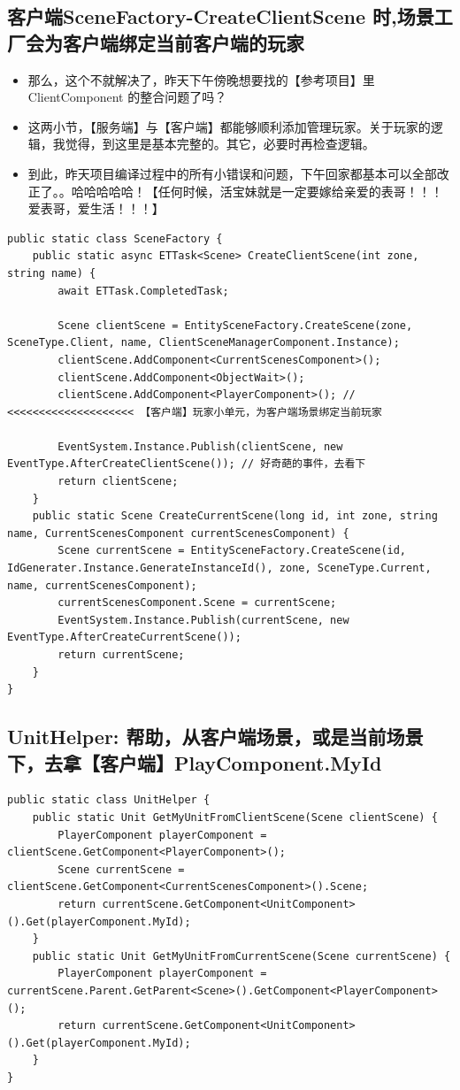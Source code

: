 \documentclass[9pt, b5paper]{article}
\begin{document}
\subsection{客户端SceneFactory-CreateClientScene 时,场景工厂会为客户端绑定当前客户端的玩家}
\label{sec-9-7}
\begin{itemize}
\item 那么，这个不就解决了，昨天下午傍晚想要找的【参考项目】里 ClientComponent 的整合问题了吗？
\item 这两小节，【服务端】与【客户端】都能够顺利添加管理玩家。关于玩家的逻辑，我觉得，到这里是基本完整的。其它，必要时再检查逻辑。
\item 到此，昨天项目编译过程中的所有小错误和问题，下午回家都基本可以全部改正了。。哈哈哈哈哈！【任何时候，活宝妹就是一定要嫁给亲爱的表哥！！！爱表哥，爱生活！！！】
\end{itemize}
\begin{verbatim}
public static class SceneFactory {
    public static async ETTask<Scene> CreateClientScene(int zone, string name) {
        await ETTask.CompletedTask;

        Scene clientScene = EntitySceneFactory.CreateScene(zone, SceneType.Client, name, ClientSceneManagerComponent.Instance);
        clientScene.AddComponent<CurrentScenesComponent>();
        clientScene.AddComponent<ObjectWait>();
        clientScene.AddComponent<PlayerComponent>(); // <<<<<<<<<<<<<<<<<<<< 【客户端】玩家小单元，为客户端场景绑定当前玩家 

        EventSystem.Instance.Publish(clientScene, new EventType.AfterCreateClientScene()); // 好奇葩的事件，去看下
        return clientScene;
    }
    public static Scene CreateCurrentScene(long id, int zone, string name, CurrentScenesComponent currentScenesComponent) {
        Scene currentScene = EntitySceneFactory.CreateScene(id, IdGenerater.Instance.GenerateInstanceId(), zone, SceneType.Current, name, currentScenesComponent);
        currentScenesComponent.Scene = currentScene;
        EventSystem.Instance.Publish(currentScene, new EventType.AfterCreateCurrentScene());
        return currentScene;
    }
}
\end{verbatim}
\subsection{UnitHelper: 帮助，从客户端场景，或是当前场景下，去拿【客户端】PlayComponent.MyId}
\label{sec-9-8}
\begin{verbatim}
public static class UnitHelper {
    public static Unit GetMyUnitFromClientScene(Scene clientScene) {
        PlayerComponent playerComponent = clientScene.GetComponent<PlayerComponent>();
        Scene currentScene = clientScene.GetComponent<CurrentScenesComponent>().Scene;
        return currentScene.GetComponent<UnitComponent>().Get(playerComponent.MyId);
    }
    public static Unit GetMyUnitFromCurrentScene(Scene currentScene) {
        PlayerComponent playerComponent = currentScene.Parent.GetParent<Scene>().GetComponent<PlayerComponent>();
        return currentScene.GetComponent<UnitComponent>().Get(playerComponent.MyId);
    }
}
\end{verbatim}
\end{document}
